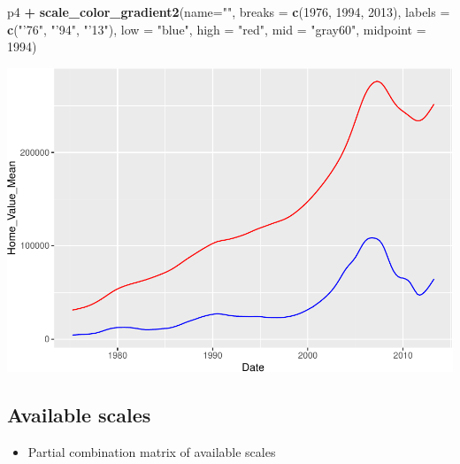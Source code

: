 \documentclass[]{book}
\newenvironment{Shaded}{\begin{snugshade}}{\end{snugshade}}
\newcommand{\DataTypeTok}[1]{\textcolor[rgb]{0.13,0.29,0.53}{#1}}
\newcommand{\DecValTok}[1]{\textcolor[rgb]{0.00,0.00,0.81}{#1}}
\newcommand{\KeywordTok}[1]{\textcolor[rgb]{0.13,0.29,0.53}{\textbf{#1}}}
\newcommand{\NormalTok}[1]{#1}
\newcommand{\OperatorTok}[1]{\textcolor[rgb]{0.81,0.36,0.00}{\textbf{#1}}}
\newcommand{\StringTok}[1]{\textcolor[rgb]{0.31,0.60,0.02}{#1}}
\providecommand{\tightlist}{%
  \setlength{\itemsep}{0pt}\setlength{\parskip}{0pt}}
\begin{document}
\begin{Shaded}
\begin{Highlighting}[]
\NormalTok{p4 }\OperatorTok{+}
\StringTok{  }\KeywordTok{scale_color_gradient2}\NormalTok{(}\DataTypeTok{name=}\StringTok{""}\NormalTok{,}
                        \DataTypeTok{breaks =} \KeywordTok{c}\NormalTok{(}\DecValTok{1976}\NormalTok{, }\DecValTok{1994}\NormalTok{, }\DecValTok{2013}\NormalTok{),}
                        \DataTypeTok{labels =} \KeywordTok{c}\NormalTok{(}\StringTok{"'76"}\NormalTok{, }\StringTok{"'94"}\NormalTok{, }\StringTok{"'13"}\NormalTok{),}
                        \DataTypeTok{low =} \StringTok{"blue"}\NormalTok{,}
                        \DataTypeTok{high =} \StringTok{"red"}\NormalTok{,}
                        \DataTypeTok{mid =} \StringTok{"gray60"}\NormalTok{,}
                        \DataTypeTok{midpoint =} \DecValTok{1994}\NormalTok{)}
\end{Highlighting}
\end{Shaded}

\includegraphics{R/Rgraphics/figures/unnamed-chunk-185-1.pdf}

\hypertarget{available-scales}{%
\subsection{Available scales}\label{available-scales}}

\begin{itemize}
\tightlist
\item
  Partial combination matrix of available scales
\end{itemize}
\end{document}
